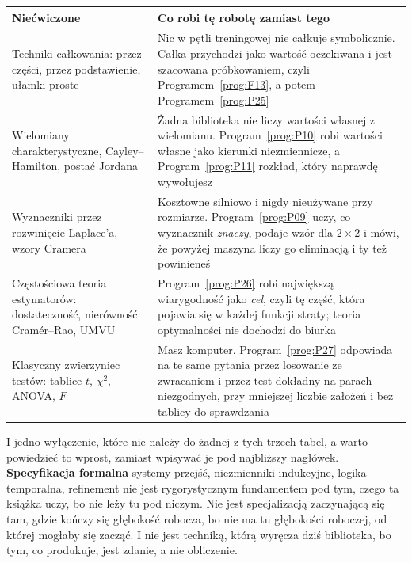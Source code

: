 \begin{center}
\begin{tabularx}{\linewidth}{@{}XX@{}}
\toprule
\textbf{Niećwiczone} & \textbf{Co robi tę robotę zamiast tego} \\
\midrule
Techniki całkowania: przez części, przez podstawienie, ułamki proste & Nic w
  pętli treningowej nie całkuje symbolicznie. Całka przychodzi jako wartość
  oczekiwana i jest szacowana próbkowaniem, czyli Programem~\ref{prog:F13},
  a potem Programem~\ref{prog:P25} \\
Wielomiany charakterystyczne, Cayley--Hamilton, postać Jordana & Żadna
  biblioteka nie liczy wartości własnej z wielomianu. Program~\ref{prog:P10}
  robi wartości własne jako kierunki niezmiennicze, a Program~\ref{prog:P11}
  rozkład, który naprawdę wywołujesz \\
Wyznaczniki przez rozwinięcie Laplace'a, wzory Cramera & Kosztowne silniowo i
  nigdy nieużywane przy rozmiarze. Program~\ref{prog:P09} uczy, co wyznacznik
  \emph{znaczy}, podaje wzór dla $2 \times 2$ i mówi, że powyżej maszyna liczy
  go eliminacją i ty też powinieneś \\
Częstościowa teoria estymatorów: dostateczność, nierówność Cramér--Rao, UMVU &
  Program~\ref{prog:P26} robi największą wiarygodność jako \emph{cel}, czyli
  tę część, która pojawia się w każdej funkcji straty; teoria optymalności nie
  dochodzi do biurka \\
Klasyczny zwierzyniec testów: tablice $t$, $\chi^{2}$, ANOVA, $F$ & Masz
  komputer. Program~\ref{prog:P27} odpowiada na te same pytania przez losowanie
  ze zwracaniem i przez test dokładny na parach niezgodnych, przy mniejszej
  liczbie założeń i bez tablicy do sprawdzania \\
\bottomrule
\end{tabularx}
\end{center}

\medskip
I jedno wyłączenie, które nie należy do żadnej z tych trzech tabel, a warto
powiedzieć to wprost, zamiast wpisywać je pod najbliższy nagłówek.
\textbf{Specyfikacja formalna} \dash{} systemy przejść, niezmienniki
indukcyjne, logika temporalna, refinement \dash{} nie jest rygorystycznym
fundamentem pod tym, czego ta książka uczy, bo nie leży tu pod niczym. Nie
jest specjalizacją zaczynającą się tam, gdzie kończy się głębokość robocza, bo
nie ma tu głębokości roboczej, od której mogłaby się zacząć. I nie jest
techniką, którą wyręcza dziś biblioteka, bo tym, co produkuje, jest zdanie, a
nie obliczenie.


